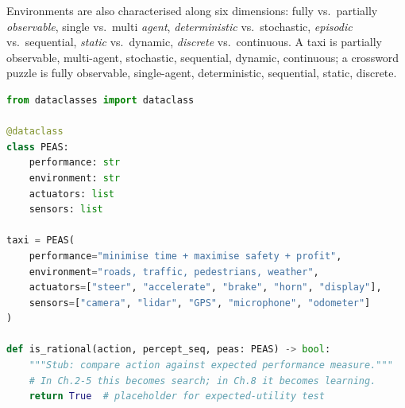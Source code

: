 \begin{table}[h]
\centering
{}%
\caption{PEAS descriptions make the design problem explicit. Changing any column (e.g., adding a sensor) changes the rational policy.}
\label{tab:peas}
\end{table}

Environments are also characterised along six dimensions: fully vs.\ partially \emph{observable}, single vs.\ multi \emph{agent}, \emph{deterministic} vs.\ stochastic, \emph{episodic} vs.\ sequential, \emph{static} vs.\ dynamic, \emph{discrete} vs.\ continuous. A taxi is partially observable, multi-agent, stochastic, sequential, dynamic, continuous; a crossword puzzle is fully observable, single-agent, deterministic, sequential, static, discrete.

\begin{lstlisting}[language=Python, caption={PEAS as a data structure: specifying a task before coding the agent.}, label={lst:peas}]
from dataclasses import dataclass

@dataclass
class PEAS:
    performance: str
    environment: str
    actuators: list
    sensors: list

taxi = PEAS(
    performance="minimise time + maximise safety + profit",
    environment="roads, traffic, pedestrians, weather",
    actuators=["steer", "accelerate", "brake", "horn", "display"],
    sensors=["camera", "lidar", "GPS", "microphone", "odometer"]
)

def is_rational(action, percept_seq, peas: PEAS) -> bool:
    """Stub: compare action against expected performance measure."""
    # In Ch.2-5 this becomes search; in Ch.8 it becomes learning.
    return True  # placeholder for expected-utility test
\end{lstlisting}

